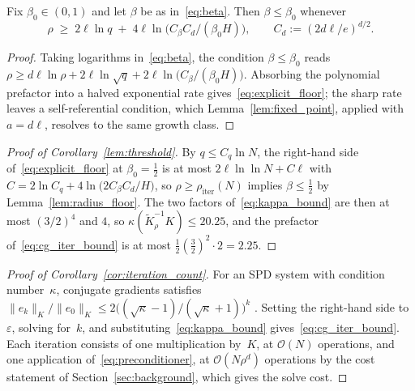 \begin{lemma}\label{lem:radius_floor}
Fix $\beta_0 \in (0,1)$ and let $\beta$ be as in~\eqref{eq:beta}.  Then
$\beta \leq \beta_0$ whenever
\begin{equation}\label{eq:explicit_floor}
  \rho \;\geq\; 2\ell\ln q
    \;+\; 4\ell\ln\!\bigl(C_\beta C_d/(\beta_0 H)\bigr),
  \qquad C_d := (2d\ell/e)^{d/2}.
\end{equation}
\end{lemma}

\begin{proof}
Taking logarithms in~\eqref{eq:beta}, the condition
$\beta \leq \beta_0$ reads
$\rho \geq d\ell\ln\rho + 2\ell\ln\sqrt{q}
 + 2\ell\ln\bigl(C_\beta/(\beta_0 H)\bigr)$.  Absorbing the polynomial
prefactor into a halved exponential rate
gives~\eqref{eq:explicit_floor}; the sharp rate leaves a
self-referential condition, which Lemma~\ref{lem:fixed_point}, applied
with $a = d\ell$, resolves to the same growth class.
\end{proof}

\begin{proof}[Proof of Corollary~\textup{\ref{lem:threshold}}]
By $q \leq C_q \ln N$, the right-hand side
of~\eqref{eq:explicit_floor} at $\beta_0 = \tfrac12$ is at most
$2\ell\ln\ln N + C\ell$ with
$C = 2\ln C_q + 4\ln\!\bigl(2 C_\beta C_d/H\bigr)$, so
$\rho \geq \rho_{\mathrm{iter}}(N)$ implies $\beta \leq \tfrac12$ by
Lemma~\ref{lem:radius_floor}.  The two factors
of~\eqref{eq:kappa_bound} are then at most $(3/2)^4$ and $4$, so
$\kappa(\widetilde{K}_\rho^{-1}K) \leq 20.25$, and the prefactor
of~\eqref{eq:cg_iter_bound} is at most
$\tfrac12 (\tfrac32)^2 \cdot 2 = 2.25$.
\end{proof}

\begin{proof}[Proof of Corollary~\textup{\ref{cor:iteration_count}}]
For an SPD system with condition number~$\kappa$, conjugate gradients
satisfies
$\|e_k\|_K / \|e_0\|_K \leq
 2\bigl((\sqrt{\kappa}-1)/(\sqrt{\kappa}+1)\bigr)^k$
\cite[\S6.11.3]{saad2003iterative}.  Setting the right-hand side
to~$\varepsilon$, solving for~$k$, and
substituting~\eqref{eq:kappa_bound} gives~\eqref{eq:cg_iter_bound}.
Each iteration consists of one multiplication by~$K$, at
$\mathcal{O}(N)$ operations, and one application
of~\eqref{eq:preconditioner}, at $\mathcal{O}(N\rho^d)$ operations by
the cost statement of Section~\ref{sec:background}, which gives the
solve cost.
\end{proof}

